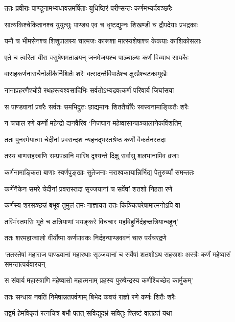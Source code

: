 \twolineshloka
{ततः प्रवीराः पाण्डूनामभ्यधावन्नमर्षिताः}
{युधिष्ठिरं परीप्सन्तः कर्णमभ्यर्दयञ्छरैः}


\twolineshloka
{सात्यकिश्चेकितानश्च युयुत्सुः पाण्ड्य एव च}
{धृष्टद्युम्नः शिखण्डी च द्रौपदेयाः प्रभद्रकाः}


\twolineshloka
{यमौ च भीमसेनश्च शिशुपालस्य चात्मजः}
{कारूशा मात्स्यशेषाश्च केकयाः काशिकोसलाः}


\twolineshloka
{एते च त्वरिता वीरा वसुषेणमताडयन्}
{जनमेजयश्च पाञ्चाल्यः कर्णं विव्याध सायकैः}


\twolineshloka
{वाराहकर्णनाराचैर्नालीकैर्निशितैः शरैः}
{वत्सदन्तैर्विपाठैश्च क्षुरप्रैश्चटकामुखैः}


\twolineshloka
{नानाप्रहरणैश्चोग्रै रथहस्त्यश्वसादिभिः}
{सर्वतोऽभ्यद्रवत्कर्णं परिवार्य जिघांसया}


\twolineshloka
{स पाण्डवानां प्रवरैः सर्वतः समभिद्रुतः}
{छाद्यमानः शिततैर्घोरैः स्वस्वनामाङ्कितैः शरैः}


\twolineshloka
{न चचाल रणे कर्णो महेन्द्रो दानवैरिव}
{`निजघान महेष्वासान्पाञ्चालानेकविंशतिम्}


\twolineshloka
{ततः पुनरमेयात्मा चेदीनां प्रवरान्दश}
{न्यहनद्भरतश्रेष्ठ कर्णो वैकर्तनस्तदा}


\twolineshloka
{तस्य बाणसहस्राणि सम्प्रपन्नानि मारिष}
{दृश्यन्ते दिक्षु सर्वासु शलभानामिव व्रजाः}


\twolineshloka
{कर्णनामाङ्किता बाणाः स्वर्णपुङ्खाः सुतेजनाः}
{नराश्वकायान्निर्भिद्य पेतुरुर्व्यां समन्ततः}


\twolineshloka
{कर्णेनैकेन समरे चेदीनां प्रवरास्तदा}
{सृज्जयानां च सर्वेषां शतशो निहता रणे}


\twolineshloka
{कर्णस्य शरसञ्छन्नं बभूव तुमुलं तमः}
{नाज्ञायत ततः किञ्चित्परेषामात्मनोऽपि वा}


\twolineshloka
{तस्मिंस्तमसि भूते च क्षत्रियाणां भयङ्करे}
{विचचार महबिहुर्निर्दहन्क्षत्रियान्बहून्'}


\twolineshloka
{ततः शरमहाज्वालो वीर्योष्मा कर्णपावकः}
{निर्दहन्पाण्डववनं चारु पर्यचरद्रणे}


\threelineshloka
{`ततस्तेषां महाराज पाण्डवानां महारथाः}
{सृञ्जयानां च सर्वेषां शतशोऽथ सहस्रशः}
{अस्त्रैः कर्णं महेष्वासं समन्तात्पर्यवारयन्}


\twolineshloka
{स संवार्य महास्त्राणि महेष्वासो महात्मनाम्}
{प्रहस्य पुरुषेन्द्रस्य कर्णश्चिच्छेद कार्मुकम्'}


\twolineshloka
{ततः सन्धाय नवतिं निमेषान्नतपर्वणाम्}
{बिभेद कवचं राज्ञो रणे कर्णः शितैः शरैः}


\twolineshloka
{तद्वर्म हेमविकृतं रत्नचित्रं बभौ पतत्}
{सविद्युदभ्रं सवितुः श्लिष्टं वातहतं यथा}


